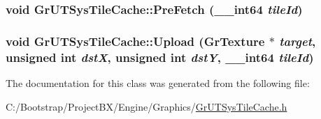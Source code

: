 \hypertarget{class_gr_u_t_sys_tile_cache_d6269bc51daf9f1913109a7bd5db8a02}{
\subsubsection[{PreFetch}]{\setlength{\rightskip}{0pt plus 5cm}void GrUTSysTileCache::PreFetch ({\bf \_\-\_\-int64} {\em tileId})}}
\label{class_gr_u_t_sys_tile_cache_d6269bc51daf9f1913109a7bd5db8a02}


\hypertarget{class_gr_u_t_sys_tile_cache_e62ec322ac0723cc5db77736e29e5b79}{
\subsubsection[{Upload}]{\setlength{\rightskip}{0pt plus 5cm}void GrUTSysTileCache::Upload ({\bf GrTexture} $\ast$ {\em target}, \/  unsigned int {\em dstX}, \/  unsigned int {\em dstY}, \/  {\bf \_\-\_\-int64} {\em tileId})}}
\label{class_gr_u_t_sys_tile_cache_e62ec322ac0723cc5db77736e29e5b79}




The documentation for this class was generated from the following file:\begin{CompactItemize}
\item 
C:/Bootstrap/ProjectBX/Engine/Graphics/\hyperlink{_gr_u_t_sys_tile_cache_8h}{GrUTSysTileCache.h}\end{CompactItemize}
